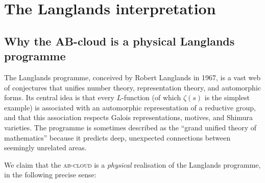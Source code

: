 \documentclass[11pt,a4paper]{article}
\theoremstyle{plain}
\theoremstyle{definition}
\theoremstyle{remark}
\newcommand{\Abcloud}{\textsc{ab-cloud}}
\begin{document}
\section{The Langlands interpretation}\label{sec:langlands}

\subsection{Why the AB-cloud is a physical Langlands programme}

The Langlands programme, conceived by Robert Langlands in 1967, is a vast web of conjectures that unifies number theory, representation theory, and automorphic forms. Its central idea is that every $L$-function (of which $\zeta(s)$ is the simplest example) is associated with an automorphic representation of a reductive group, and that this association respects Galois representations, motives, and Shimura varieties. The programme is sometimes described as the ``grand unified theory of mathematics'' because it predicts deep, unexpected connections between seemingly unrelated areas.

We claim that the \Abcloud{} is a \emph{physical} realisation of the Langlands programme, in the following precise sense:
\end{document}
